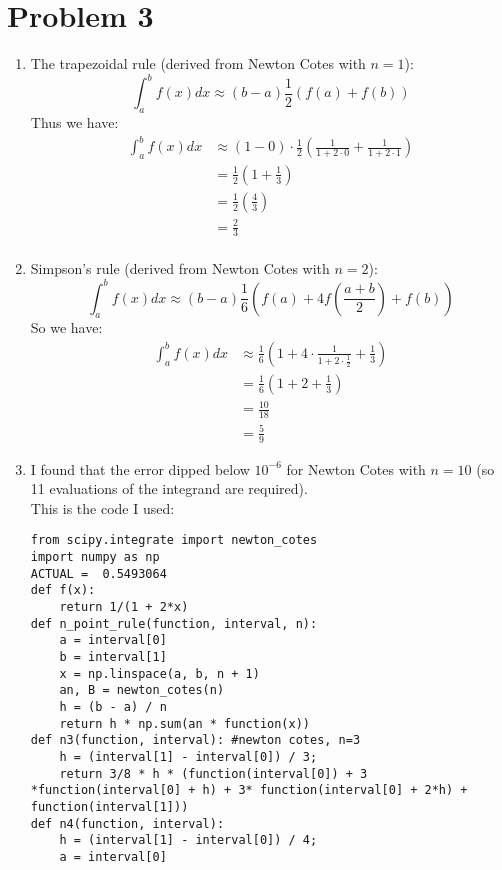 \documentclass{article}
\begin{document}
\section*{Problem 3}
\begin{enumerate}
\item The trapezoidal rule (derived from Newton Cotes with $n=1$): \\
\[
\int_a^b f(x)dx \approx (b-a) \frac{1}{2}(f(a) + f(b))
\]
Thus we have: \\
\begin{align*}
\int_a^bf(x)dx &\approx (1 - 0) \cdot \frac{1}{2}(\frac{1}{1 + 2\cdot 0} + \frac{1}{1 + 2 \cdot 1}) \\
&= \frac{1}{2}(1 + \frac{1}{3}) \\
&= \frac{1}{2}(\frac{4}{3}) \\
&= \frac{2}{3} \\
\end{align*}
\item Simpson's rule (derived from Newton Cotes with $n=2$): \\
\[
\int_a^b f(x)dx \approx  (b-a)\frac{1}{6}(f(a) + 4f(\frac{a + b}{2}) + f(b))
\]
So we have: \\
\begin{align*}
\int_a^b f(x)dx &\approx \frac{1}{6}(1 + 4 \cdot \frac{1}{1 + 2 \cdot \frac{1}{2}} + \frac{1}{3}) \\
&= \frac{1}{6}(1 + 2 + \frac{1}{3}) \\
&= \frac{10}{18} \\
&= \frac{5}{9}
\end{align*}
\item I found that the error dipped below $10^{-6}$ for Newton Cotes with $n=10$ (so 11 evaluations of the integrand are required). \\
This is the code I used: \\
\begin{lstlisting}
from scipy.integrate import newton_cotes
import numpy as np
ACTUAL =  0.5493064 
def f(x):
    return 1/(1 + 2*x)
def n_point_rule(function, interval, n):
    a = interval[0]
    b = interval[1]
    x = np.linspace(a, b, n + 1)
    an, B = newton_cotes(n)
    h = (b - a) / n
    return h * np.sum(an * function(x))
def n3(function, interval): #newton cotes, n=3
    h = (interval[1] - interval[0]) / 3;
    return 3/8 * h * (function(interval[0]) + 3 *function(interval[0] + h) + 3* function(interval[0] + 2*h) + function(interval[1]))
def n4(function, interval):
    h = (interval[1] - interval[0]) / 4;
    a = interval[0]

\end{lstlisting}
\end{enumerate}
\end{document}
